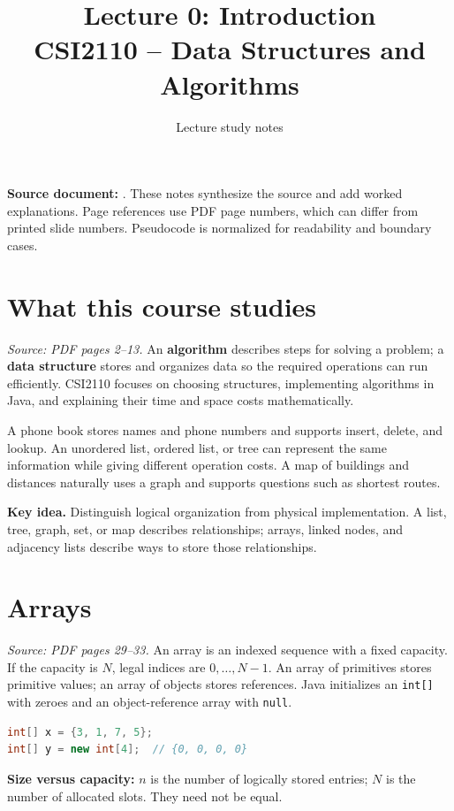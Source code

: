\documentclass[11pt,letterpaper]{article}
\title{\textbf{Lecture 0: Introduction}\\[3pt]\large CSI2110 -- Data Structures and Algorithms}
\author{Lecture study notes}\date{}
\newcommand{\sourcepages}[1]{\textit{Source: PDF pages #1.}}
\newcommand{\keyidea}[1]{\par\textbf{Key idea.} #1\par}
\newcommand{\method}[1]{\texttt{#1}}
\begin{document}
\maketitle
\textbf{Source document:} .
These notes synthesize the source and add worked explanations. Page references use PDF page numbers, which can differ from printed slide numbers. Pseudocode is normalized for readability and boundary cases.
\tableofcontents\newpage

\section{What this course studies}
\sourcepages{2--13}
An \textbf{algorithm} describes steps for solving a problem; a \textbf{data structure} stores and organizes data so the required operations can run efficiently. CSI2110 focuses on choosing structures, implementing algorithms in Java, and explaining their time and space costs mathematically.

A phone book stores names and phone numbers and supports insert, delete, and lookup. An unordered list, ordered list, or tree can represent the same information while giving different operation costs. A map of buildings and distances naturally uses a graph and supports questions such as shortest routes.

\keyidea{Distinguish logical organization from physical implementation. A list, tree, graph, set, or map describes relationships; arrays, linked nodes, and adjacency lists describe ways to store those relationships.}

\section{Arrays}
\sourcepages{29--33}
An array is an indexed sequence with a fixed capacity. If the capacity is $N$, legal indices are $0,\ldots,N-1$. An array of primitives stores primitive values; an array of objects stores references. Java initializes an \method{int[]} with zeroes and an object-reference array with \method{null}.
\par\noindent\begin{minipage}{\linewidth}
\begin{lstlisting}[language=Java]
int[] x = {3, 1, 7, 5};
int[] y = new int[4];  // {0, 0, 0, 0}
\end{lstlisting}
\end{minipage}\par
\textbf{Size versus capacity:} $n$ is the number of logically stored entries; $N$ is the number of allocated slots. They need not be equal.
\end{document}
